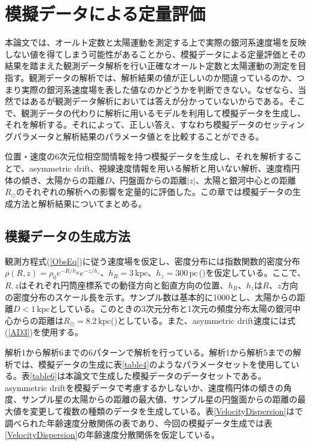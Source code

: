 \chapter{模擬データによる定量評価 \label{chapMock}}




本論文では、オールト定数と太陽運動を測定する上で実際の銀河系速度場を反映しない値を得てしまう可能性があることから、模擬データによる定量評価とその結果を踏まえた観測データ解析を行い正確なオールト定数と太陽運動の測定を目指す。観測データの解析では、解析結果の値が正しいのか間違っているのか、つまり実際の銀河系速度場を表した値なのかどうかを判断できない。なぜなら、当然ではあるが観測データ解析においては答えが分かっていないからである。そこで、観測データの代わりに解析に用いるモデルを利用して模擬データを生成し、それを解析する。それによって、正しい答え、すなわち模擬データのセッティングパラメータと解析結果のパラメータ値とを比較することができる。

位置・速度の6次元位相空間情報を持つ模擬データを生成し、それを解析することで、asymmetric drift、視線速度情報を用いる解析と用いない解析、速度楕円体の傾き、太陽からの距離$D$、円盤面からの距離$|z|$、太陽と銀河中心との距離$R_{\odot}$のそれぞれの解析への影響を定量的に評価した。この章では模擬データの生成方法と解析結果についてまとめる。

\section{模擬データの生成方法}
観測方程式(\ref{ObsEq})に従う速度場を仮定し、密度分布には指数関数的密度分布$\rho(R,z) = \rho_0 e^{-R/h_R} e^{-z/h_z}、h_R=3\,\mathrm{kpc}、h_z=300\,\mathrm{pc}$\,(\cite{BH2016})を仮定している。ここで、$R,z$はそれぞれ円筒座標系での動径方向と鉛直方向の位置、$h_R、h_z$は$R、z$方向の密度分布のスケール長を示す。サンプル数は基本的に1000とし、太陽からの距離$D<1\,\mathrm{kpc}$としている。このときの3次元分布と1次元の頻度分布太陽の銀河中心からの距離は$R_{\odot} = 8.2\,\mathrm{kpc}$(\cite{BH2016})としている。また、asymmetric drift速度には式(\ref{AD3})を使用する。

解析1から解析6までの6パターンで解析を行っている。解析1から解析5までの解析では、模擬データの生成に表\ref{table4}のようなパラメータセットを使用している。表\ref{table6}は本論文で生成した模擬データのデータセットである。asymmetric driftを模擬データで考慮するかしないか、速度楕円体の傾きの角度、サンプル星の太陽からの距離の最大値、サンプル星の円盤面からの距離の最大値を変更して複数の種類のデータを生成している。表\ref{VelocityDispersion}は\cite{YL18}で調べられた年齢速度分散関係の表であり、今回の模擬データ生成では表\ref{VelocityDispersion}の年齢速度分散関係を仮定している。

